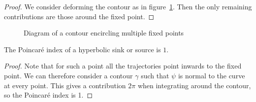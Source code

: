 \documentclass[../Main.tex]{subfiles}
\begin{document}
\begin{proof}
    We consider deforming the contour as in figure~\ref{figDeformedContour}. Then the only remaining contributions are those around the fixed point.
\end{proof}
\begin{figure}
    \centering
    \caption{Diagram of a contour encircling multiple fixed points}
    \label{figDeformedContour}
\end{figure}
\begin{proposition}
    The Poincaré index of a hyperbolic sink or source is $1$.
    \label{propPoincIndHyp}
\end{proposition}
\begin{proof}
    Note that for such a point all the trajectories point inwards to the fixed point. We can therefore consider a contour $\gamma$ such that $\psi$ is normal to the curve at every point. This gives a contribution $2\pi$ when integrating around the contour, so the Poincaré index is 1.
\end{proof}
\end{document}

